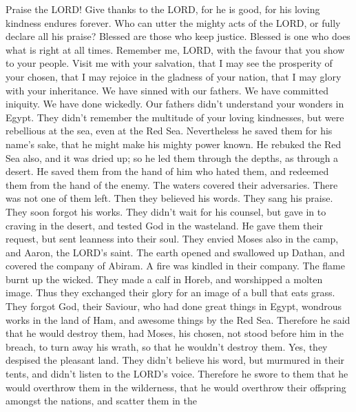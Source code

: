  Praise the LORD! Give thanks to the LORD, for he is good,
for his loving kindness endures forever.  Who can utter the
mighty acts of the LORD, or fully declare all his praise? 
Blessed are those who keep justice. Blessed is one who does what is
right at all times.  Remember me, LORD, with the favour that
you show to your people. Visit me with your salvation,  that
I may see the prosperity of your chosen, that I may rejoice in the
gladness of your nation, that I may glory with your inheritance.
 We have sinned with our fathers. We have committed
iniquity. We have done wickedly.  Our fathers didn't
understand your wonders in Egypt. They didn't remember the multitude of
your loving kindnesses, but were rebellious at the sea, even at the Red
Sea.  Nevertheless he saved them for his name's sake, that
he might make his mighty power known.  He rebuked the Red
Sea also, and it was dried up; so he led them through the depths, as
through a desert.  He saved them from the hand of him who
hated them, and redeemed them from the hand of the enemy. 
The waters covered their adversaries. There was not one of them left.
 Then they believed his words. They sang his praise.
 They soon forgot his works. They didn't wait for his
counsel,  but gave in to craving in the desert, and tested
God in the wasteland.  He gave them their request, but sent
leanness into their soul.  They envied Moses also in the
camp, and Aaron, the LORD's saint.  The earth opened and
swallowed up Dathan, and covered the company of Abiram.  A
fire was kindled in their company. The flame burnt up the wicked.
 They made a calf in Horeb, and worshipped a molten image.
 Thus they exchanged their glory for an image of a bull
that eats grass.  They forgot God, their Saviour, who had
done great things in Egypt,  wondrous works in the land of
Ham, and awesome things by the Red Sea.  Therefore he said
that he would destroy them, had Moses, his chosen, not stood before him
in the breach, to turn away his wrath, so that he wouldn't destroy them.
 Yes, they despised the pleasant land. They didn't believe
his word,  but murmured in their tents, and didn't listen
to the LORD's voice.  Therefore he swore to them that he
would overthrow them in the wilderness,  that he would
overthrow their offspring amongst the nations, and scatter them in the
